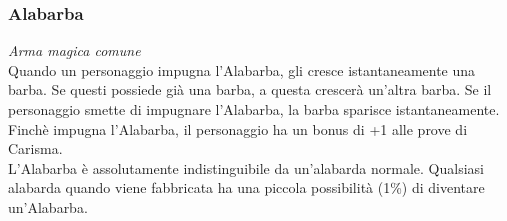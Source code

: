 \subsubsection{Alabarba}
\textit{Arma magica comune}\\
Quando un personaggio impugna l'Alabarba, gli cresce istantaneamente una barba. Se questi possiede già una barba, a questa crescerà un'altra barba. Se il personaggio smette di impugnare l'Alabarba, la barba sparisce istantaneamente. Finchè impugna l'Alabarba, il personaggio ha un bonus di +1 alle prove di Carisma.\\
L'Alabarba è assolutamente indistinguibile da un'alabarda normale. Qualsiasi alabarda quando viene fabbricata ha una piccola possibilità (1\%) di diventare un'Alabarba.